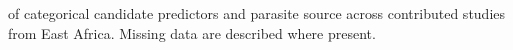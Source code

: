 \begin{table}[htbp]
\begin{threeparttable}
\begin{tablenotes}
        \end{tablenotes}
    \end{threeparttable}
    \caption[East Africa: categorical variables]{ of categorical candidate predictors and parasite source across contributed studies from East Africa.  Missing data are described where present.}
    \label{tab:ea_categorical}
\end{table}